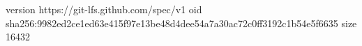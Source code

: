 version https://git-lfs.github.com/spec/v1
oid sha256:9982ed2ce1ed63e415f97e13be48d4dee54a7a30ac72c0ff3192c1b54e5f6635
size 16432
